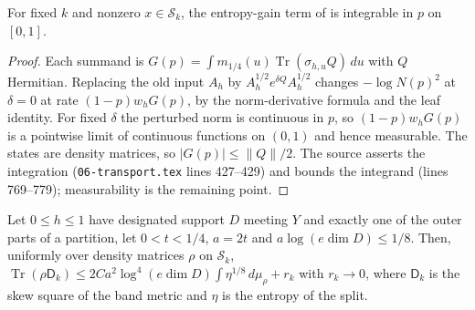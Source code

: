 \begin{lemma}\label{lem:replica_entropy_gain_integrable}
    \leanok
    For fixed $k$ and nonzero $x\in\mathcal S_k$, the entropy-gain term of
    \cite[Proposition~7.4]{OpenAI2026AreaLaw} is integrable in $p$ on $[0,1]$.
\end{lemma}

\begin{proof}\leanok
    Each summand is $G(p)=\int m_{1/4}(u)\operatorname{Tr}(\sigma_{h,u}Q)\,du$ with $Q$
    Hermitian. Replacing the old input $A_h$ by $A_h^{1/2}e^{\delta Q}A_h^{1/2}$ changes
    $-\log N(p)^2$ at $\delta=0$ at rate $(1-p)w_hG(p)$, by the norm-derivative formula and
    the leaf identity. For fixed $\delta$ the perturbed norm is continuous in $p$, so
    $(1-p)w_hG(p)$ is a pointwise limit of continuous functions on $(0,1)$ and hence
    measurable. The states are density matrices, so $|G(p)|\le\|Q\|/2$. The source asserts
    the integration (\texttt{06-transport.tex} lines 427--429) and bounds the integrand
    (lines 769--779); measurability is the remaining point.
\end{proof}

\begin{theorem}\label{thm:replica_split_skew_bound}
    \leanok
    Let $0\le h\le1$ have designated support $D$ meeting $Y$ and exactly one of the outer
    parts of a partition, let $0<t<1/4$, $a=2t$ and $a\log(e\dim D)\le1/8$. Then, uniformly
    over density matrices $\rho$ on $\mathcal S_k$,
    $\operatorname{Tr}(\rho\mathsf D_k)\le 2C a^2\log^4(e\dim D)\int\eta^{1/8}\,d\mu_\rho+r_k$
    with $r_k\to0$, where $\mathsf D_k$ is the skew square of the band metric and $\eta$ is
    the entropy of the split.
\end{theorem}

